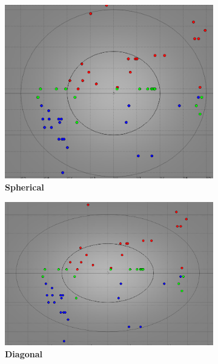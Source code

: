 \begin{figure}[!ht]
\centering
\begin{subfigure}[h]{0.3\textwidth}
\centering
\includegraphics[height=0.11\textheight]{./regression/spheri_kmeans_1_mixture_100train.png}
\caption{\bf Spherical}
\end{subfigure}
\begin{subfigure}[h]{0.3\textwidth}
\centering
\includegraphics[height=0.11\textheight]{./regression/diag_kmeans_1_mixture_100train.png}
\caption{\bf Diagonal}
\end{subfigure}
\begin{subfigure}[h]{0.3\textwidth}
\centering

\end{subfigure}
\end{figure}

